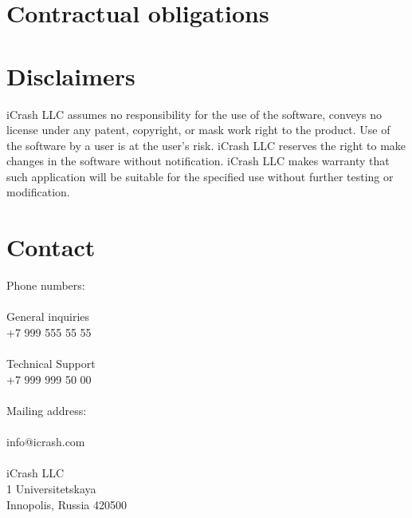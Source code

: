\section{Contractual obligations}

\section{Disclaimers}

iCrash LLC assumes no responsibility for the use of the software, conveys no
license under any patent, copyright, or mask work right to the product.
Use of the software by a user is at the user's risk.
iCrash LLC reserves the right to make changes in the software without notification.
iCrash LLC makes warranty that such application will be suitable for the specified use without further testing or modification.

\section{Contact}
Phone numbers:\\
\\
General inquiries\\
+7 999 555 55 55\\
\\
Technical Support\\
+7 999 999 50 00\\
\\
Mailing address:\\
\\
info@icrash.com\\
\\
iCrash LLC\\
1 Universitetskaya\\
Innopolis, Russia 420500